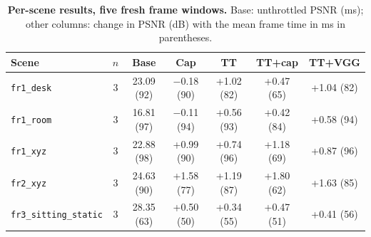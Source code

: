 \begin{table}[tbp]
\centering
\footnotesize\setlength{\tabcolsep}{1.5pt}
\begin{tabular}{lcccccc}
\toprule
\textbf{Scene} & $n$ & \textbf{Base} & \textbf{Cap} & \textbf{TT} & \textbf{TT+cap} & \textbf{TT+VGG} \\
\midrule
\texttt{fr1\_desk} & 3 & 23.09 (92) & $-$0.18 (90) & +1.02 (82) & +0.47 (65) & +1.04 (82) \\
\texttt{fr1\_room} & 3 & 16.81 (97) & $-$0.11 (94) & +0.56 (93) & +0.42 (84) & +0.58 (94) \\
\texttt{fr1\_xyz} & 3 & 22.88 (98) & +0.99 (90) & +0.74 (96) & +1.18 (69) & +0.87 (96) \\
\texttt{fr2\_xyz} & 3 & 24.63 (90) & +1.58 (77) & +1.19 (87) & +1.80 (62) & +1.63 (85) \\
\texttt{fr3\_sitting\_static} & 3 & 28.35 (63) & +0.50 (50) & +0.34 (55) & +0.47 (51) & +0.41 (56) \\
\bottomrule
\end{tabular}
\caption{\textbf{Per-scene results, five fresh frame windows.} Base: unthrottled PSNR (ms); other columns: change in PSNR (dB) with the mean frame time in ms in parentheses.}
\label{tab:method_fresh}
\end{table}
